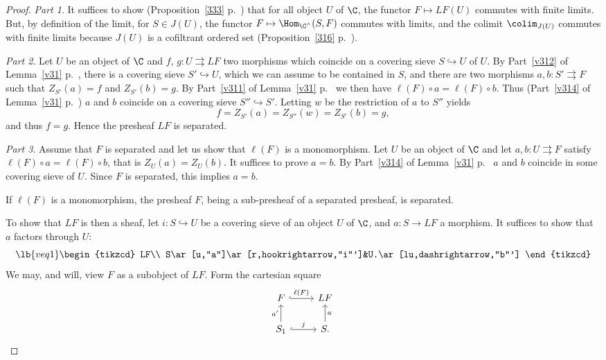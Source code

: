 \documentclass[12pt]{article}
\theoremstyle{remark}
\theoremstyle{definition}
\begin{document}
\begin{proof}
\emph{Part 1}. It suffices to show (Proposition~\ref{333} p.~\pageref{333}) that for all object $U$ of $\C$, the functor $F\mapsto LF(U)$ commutes with finite limits. But, by definition of the limit, for $S\in J(U)$, the functor $F\mapsto\Hom_{\C^\wedge}(S,F)$ commutes with limits, and the colimit $\colim_{J(U)}$ commutes with finite limits because $J(U)$ is a cofiltrant ordered set (Proposition~\ref{316} p.~\pageref{316}).

\nn\emph{Part 2}. Let $U$ be an object of $\C$ and $f$, $g:U\rightrightarrows LF$ two morphisms which coincide on a covering sieve $S\hookrightarrow U$ of $U$. By Part~\ref{v312} of Lemma~\ref{v31} p.~\pageref{v31}, there is a covering sieve $S'\hookrightarrow U$, which we can assume to be contained in $S$, and there are two morphisms $a,b:S'\rightrightarrows F$ such that $Z_{S'}(a)=f$ and $Z_{S'}(b)=g$. By Part~\ref{v311} of Lemma~\ref{v31} p.~\pageref{v31} we then have $\ell(F)\circ a=\ell(F)\circ b$. Thus (Part~\ref{v314} of Lemma~\ref{v31} p.~\pageref{v31}) $a$ and $b$ coincide on a covering sieve $S''\hookrightarrow S'$. Letting $w$ be the restriction of $a$ to $S''$ yields 
$$
f=Z_{S'}(a)=Z_{S''}(w)=Z_{S'}(b)=g,
$$ 
and thus $f=g$. Hence the presheaf $LF$ is separated.

\nn\emph{Part 3}. %
Assume that $F$ is separated and let us show that $\ell(F)$ is a monomorphism. Let $U$ be an object of $\C$ and let $a,b:U\rightrightarrows F$ satisfy $\ell(F)\circ a=\ell(F)\circ b$, that is $Z_U(a)=Z_U(b)$. It suffices to prove $a=b$. By Part~\ref{v314} of Lemma~\ref{v31} p.~\pageref{v31} $a$ and $b$ coincide in some covering sieve of $U$. Since $F$ is separated, this implies $a=b$. 

If $\ell(F)$ is a monomorphism, the presheaf $F$, being a sub-presheaf of a separated presheaf, is separated. 

To show that $LF$ is then a sheaf, let $i:S\hookrightarrow U$ be a covering sieve of an object $U$ of $\C$, and $a:S\to LF$ a morphism. It suffices to show that $a$ factors through $U$:
\begin{equation}\lb{veq1}
\begin{tikzcd}
LF\\ 
S\ar[u,"a"]\ar[r,hookrightarrow,"i"']&U.\ar[lu,dashrightarrow,"b"']
\end{tikzcd}
\end{equation}
We may, and will, view $F$ as a subobject of $LF$. Form the cartesian square 
$$
\begin{tikzcd}
F\ar[r,hookrightarrow,"\ell(F)"]&LF\\ 
S_1\ar[u,"a'"]\ar[r,hookrightarrow,"j"]&S.\ar[u,"a"']
\end{tikzcd}
$$ 


\end{proof}
\end{document}

